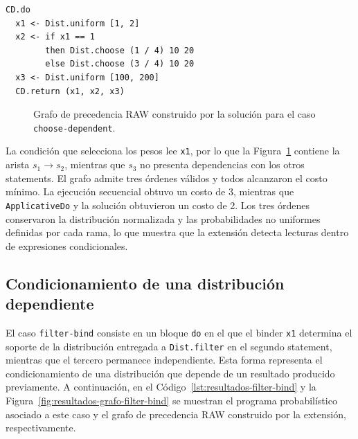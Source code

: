\begin{lstlisting}[style=haskell,caption={Programa probabilístico asociado al caso \texttt{choose-dependent}.},label={lst:resultados-choose-dependent}]
CD.do
  x1 <- Dist.uniform [1, 2]
  x2 <- if x1 == 1
        then Dist.choose (1 / 4) 10 20
        else Dist.choose (3 / 4) 10 20
  x3 <- Dist.uniform [100, 200]
  CD.return (x1, x2, x3)
\end{lstlisting}

\begin{figure}[ht]
\centering
\begin{PrecedenceGraph}[node distance=0.5cm and 0.6cm]
\end{PrecedenceGraph}
\caption[Grafo RAW del caso \texttt{choose-dependent}.]{Grafo de precedencia RAW construido por la solución para el caso \texttt{choose-dependent}.}
\label{fig:resultados-grafo-choose-dependent}
\end{figure}

La condición que selecciona los pesos lee \texttt{x1}, por lo que la Figura~\ref{fig:resultados-grafo-choose-dependent} contiene la arista $s_1\to s_2$, mientras que $s_3$ no presenta dependencias con los otros statements. El grafo admite tres órdenes válidos y todos alcanzaron el costo mínimo. La ejecución secuencial obtuvo un costo de 3, mientras que \texttt{ApplicativeDo} y la solución obtuvieron un costo de 2. Los tres órdenes conservaron la distribución normalizada y las probabilidades no uniformes definidas por cada rama, lo que muestra que la extensión detecta lecturas dentro de expresiones condicionales.

\subsection{Condicionamiento de una distribución dependiente}

El caso \texttt{filter-bind} consiste en un bloque \texttt{do} en el que el binder \texttt{x1} determina el soporte de la distribución entregada a \texttt{Dist.filter} en el segundo statement, mientras que el tercero permanece independiente. Esta forma representa el condicionamiento de una distribución que depende de un resultado producido previamente. A continuación, en el Código~\ref{lst:resultados-filter-bind} y la Figura~\ref{fig:resultados-grafo-filter-bind} se muestran el programa probabilístico asociado a este caso y el grafo de precedencia RAW construido por la extensión, respectivamente.

